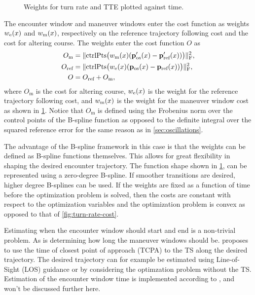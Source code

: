 \begin{figure}
    \centering
    
    \caption{Weights for turn rate and TTE plotted against time.}
    \label{fig:maneuver-window}
\end{figure}

The encounter window and maneuver windows enter the cost function as weights $w_\text e(x)$ and $w_\text m(x)$, respectively on the reference trajectory following cost and the cost for altering course. The weights enter the cost function $O$ as
\begin{equation}\label{eq:cost-maneuver-window}
    \begin{aligned}
        O_\text{m} &= \|\text{ctrlPts}\big(w_\text m(x)(\mathbf p'_\text{os}(x) - \mathbf p'_\text{ref}(x))\big)\|_\text{F}^2, \\
        O_\text{ref} &= \|\text{ctrlPts}\big(w_\text e(x)(\mathbf p_\text{os}(x) - \mathbf p_\text{ref}(x))\big)\|_\text{F}^2, \\
        O &= O_\text{ref} + O_\text{m}, \\
    \end{aligned}
\end{equation}
where $O_\text{m}$ is the cost for altering course, $w_\text e(x)$ is the weight for the reference trajectory following cost, and $w_\text m(x)$ is the weight for the maneuver window cost as shown in \cref{fig:maneuver-window}. Notice that $O_\text{m}$ is defined using the Frobenius norm over the control points of the B-spline function as opposed to the definite integral over the squared reference error for the same reason as in \cref{sec:oscillations}.

The advantage of the B-spline framework in this case is that the weights can be defined as B-spline functions themselves. This allows for great flexibility in shaping the desired encounter trajectory. The function shape shown in \cref{fig:maneuver-window}, can be represented using a zero-degree B-spline. If smoother transitions are desired, higher degree B-splines can be used.
If the weights are fixed as a function of time before the optimization problem is solved, then the costs are constant with respect to the optimization variables and the optimization problem is convex as opposed to that of \cref{fig:turn-rate-cost}.

Estimating when the encounter window should start and end is a non-trivial problem. As is determining how long the maneuver windows should be. \cite{Thyri2022-MPC} proposes to use the time of closest point of approach (TCPA) to the TS along the desired trajectory. The desired trajectory can for example be estimated using Line-of-Sight (LOS) guidance \citep{Fossen2011-Handbook} or by considering the optimzation problem without the TS. Estimation of the encounter window time is implemented according to \cite{Thyri2022-MPC}, and won't be discussed further here.


